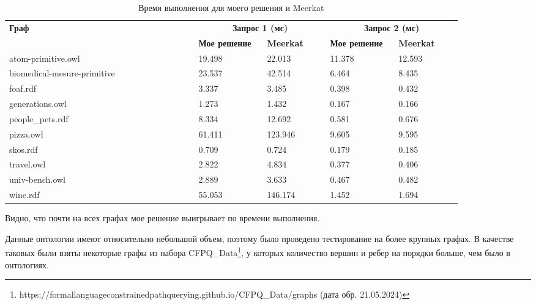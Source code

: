 \begin{table}[h]
    \caption{Время выполнения для моего решения и Meerkat}
    \begin{tabular}{|b{0.36\linewidth}|b{0.13\linewidth}|b{0.12\linewidth}|b{0.13\linewidth}|b{0.12\linewidth}|}
        \hline
        \textbf{Граф} & \multicolumn{2}{|c|}{\textbf{Запрос 1 (мс)}} & \multicolumn{2}{|c|}{\textbf{Запрос 2 (мс)}} \\
        \cline{2-5}
         & \textbf{Мое решение} & \textbf{Meerkat} & \textbf{Мое решение} & \textbf{Meerkat} \\ 
        \hline
        atom-primitive.owl  & 19.498 & 22.013 & 11.378 & 12.593 \\
        biomedical-mesure-primitive  & 23.537 & 42.514 & 6.464 & 8.435 \\
        foaf.rdf  & 3.337 & 3.485 & 0.398 & 0.432 \\
        generations.owl  & 1.273 & 1.432 & 0.167 & 0.166 \\
        people\_pets.rdf  & 8.334 & 12.692 & 0.581 & 0.676 \\
        pizza.owl  & 61.411 & 123.946 & 9.605 & 9.595 \\
        skos.rdf  & 0.709 & 0.724 & 0.179 & 0.185 \\
        travel.owl  & 2.822 & 4.834 & 0.377 & 0.406 \\
        univ-bench.owl  & 2.889 & 3.633 & 0.467 & 0.482 \\
        wine.rdf  & 55.053 & 146.174 & 1.452 & 1.694 \\
        \hline
    \end{tabular}
    \label{tab:rdfTimes}
\end{table}

Видно, что почти на всех графах мое решение выигрывает по времени выполнения. 

Данные онтологии имеют относительно небольшой объем, поэтому было проведено тестирование на более крупных графах. В качестве таковых были взяты некоторые графы из набора CFPQ\_Data\footnote{https://formallanguageconstrainedpathquerying.github.io/CFPQ\_Data/graphs (дата обр. 21.05.2024)}, у которых количество вершин и ребер на порядки больше, чем было в онтологиях.

